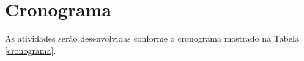 \chapter{Cronograma} \label{cap:cronograma}
As atividades serão desenvolvidas conforme o cronograma mostrado na Tabela \ref{cronograma}.

